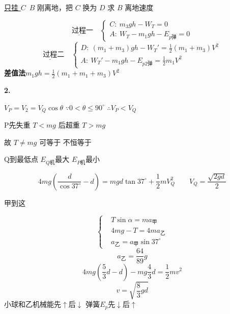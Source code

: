 \begin{problem}
\underline{只挂 $C$}\ $B$ 刚离地，把 $C$ 换为 $D$ 求 $B$ 离地速度
\begin{solution}
\[
\underline{\text{过程}}\text{一}\quad
\begin{cases}
C:\ m_3gh-W_T=0\\
A:\ W_T-m_1gh-E_{p\text{弹}}=0
\end{cases}
\]
\[
\underline{\text{过程}}\text{二}\quad
\begin{cases}
D:\ (m_1+m_3)gh-W_T'=\tfrac12(m_1+m_3)V^2\\
A:\ W_T'-m_1gh-E_{p2\text{弹}}=\tfrac12 m_1V^2
\end{cases}
\]
\textbf{差值法}\quad $m_1gh=\tfrac12(m_1+m_1+m_3)V^2$
\end{solution}
\end{problem}

\textbf{2.}

$V_P=V_2=V_Q\cos\theta$ \qquad $\because 0<\theta\le90^\circ$ \quad $\therefore V_P<V_Q$

P先失重 $T<mg$ 后超重 $T>mg$ %

故 $T\ne mg$ \quad 可等于 不恒等于

Q到最低点 $E_{Q\text{机}}$最大 $E_{P\text{机}}$最小

\[ 4mg\left(\frac{d}{\cos37^\circ}-d\right)=mgd\tan37^\circ+\frac12 mV_Q^{2}\qquad V_Q=\frac{\sqrt{2gd}}{2} \]

\begin{problem}
甲到这
\begin{solution}
\[ \left\{\begin{aligned} &T\sin\alpha=ma_{\text{甲}}\\ &4mg-T=4ma_{\text{乙}}\\ &a_{\text{乙}}=a_{\text{甲}}\sin37^\circ \end{aligned}\right. \] %
\[ a_{\text{乙}}=\frac{64}{89}g \]
\[ 4mg\left(\frac{5}{3}d-d\right)-mg\frac{4}{3}d=\frac{1}{2}mv^2 \]
\[ v=\sqrt{\frac{8}{3}gd} \]
小球和乙机械能先$\uparrow$后$\downarrow$ \qquad {}弹簧$E_p$先$\downarrow$后$\uparrow$
\end{solution}
\end{problem}

